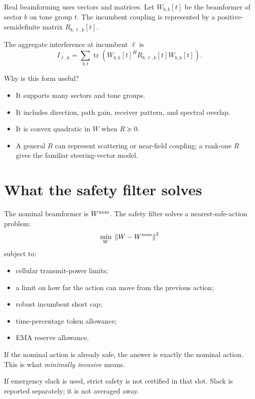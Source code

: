 \documentclass[11pt]{article}
\newcommand{\norm}[1]{\left\lVert #1\right\rVert}
\begin{document}
Real beamforming uses vectors and matrices. Let $W_{b,k}[t]$ be the beamformer of sector $b$ on tone group $t$. The incumbent coupling is represented by a positive-semidefinite matrix $R_{b,\ell,k}[t]$.

The aggregate interference at incumbent $\ell$ is
\begin{equation}
 I_{\ell,k}=\sum_{b,t}\operatorname{tr}\left(W_{b,k}[t]^H R_{b,\ell,k}[t]W_{b,k}[t]\right).
\end{equation}

Why is this form useful?

\begin{itemize}
\item It supports many sectors and tone groups.
\item It includes direction, path gain, receiver pattern, and spectral overlap.
\item It is convex quadratic in $W$ when $R\succeq0$.
\item A general $R$ can represent scattering or near-field coupling; a rank-one $R$ gives the familiar steering-vector model.
\end{itemize}

\section{What the safety filter solves}

The nominal beamformer is $W^{\rm nom}$. The safety filter solves a nearest-safe-action problem:
\begin{equation}
 \min_W\;\norm{W-W^{\rm nom}}^2
\end{equation}
subject to:

\begin{itemize}
\item cellular transmit-power limits;
\item a limit on how far the action can move from the previous action;
\item robust incumbent short cap;
\item time-percentage token allowance;
\item EMA reserve allowance.
\end{itemize}

If the nominal action is already safe, the answer is exactly the nominal action. This is what \emph{minimally invasive} means.

If emergency slack is used, strict safety is not certified in that slot. Slack is reported separately; it is not averaged away.
\end{document}
